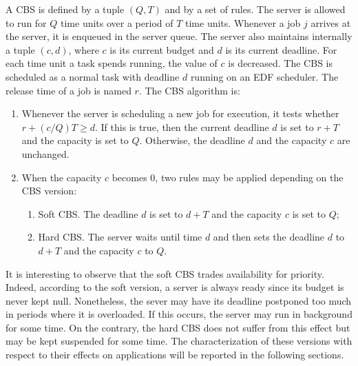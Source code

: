 \documentclass[times, 10pt,twocolumn]{article}
\begin{document}
\label{sec:soft-hard-cbs}

A CBS \cite{abeni.ea98:integrating} is
defined by a tuple $(Q,T)$ and by a set of rules. The server is allowed to
run for $Q$ time units over a period of $T$ time units. Whenever a job
$j$ arrives at the server, it is enqueued in the server queue. The
server also maintains internally a tuple $(c,d)$, where $c$ is its
current budget and $d$ is its current deadline. For each time unit a
task spends running, the value of $c$ is decreased. The CBS is
scheduled as a normal task with deadline $d$ running on an EDF
scheduler. The release time of a job is named $r$. The CBS algorithm
is:
\begin{enumerate}
\item Whenever the server is scheduling a new job for execution, it
  tests whether $r + (c/Q)T \geq d$. If this is true, then the current
  deadline $d$ is set to $r+T$ and the capacity is set to
  $Q$. Otherwise, the deadline $d$ and the capacity $c$ are unchanged.
\item When the capacity $c$ becomes $0$, two rules may be applied depending on the CBS version:
  \begin{enumerate}
  \item Soft CBS. The deadline $d$ is set to $d+T$
    and the capacity $c$ is set to $Q$;
  \item Hard CBS. The server waits until time $d$ and then sets the
    deadline $d$ to $d+T$ and the capacity $c$ to $Q$.
  \end{enumerate}
\end{enumerate}

It is interesting to observe that the soft CBS trades availability for priority.
Indeed, according to the soft version, a server is always ready since its budget is never kept null. 
Nonetheless, the sever may have its deadline postponed too much in periods 
where it is overloaded. If this occurs, the server may run in background for some time. 
On the contrary, the hard CBS does not suffer from this effect but may be kept suspended for some time.
The characterization of these versions with respect to their effects on applications will be reported in the 
following sections.
 
\label{sec:simul-envir}
\end{document}
